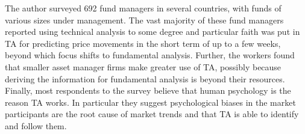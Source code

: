 The author surveyed 692 fund managers in several countries, with funds of various sizes under management. The vast majority of these fund managers reported using technical analysis to some degree and particular faith was put in TA for predicting price movements in the short term of up to a few weeks, beyond which focus shifts to fundamental analysis. Further, the workers found that smaller asset manager firms make greater use of TA, possibly because deriving the information for fundamental analysis is beyond their resources. Finally, most respondents to the survey believe that human psychology is the reason TA works. In particular they suggest psychological biases in the market participants are the root cause of market trends and that TA is able to identify and follow them.

%
%
%
%

